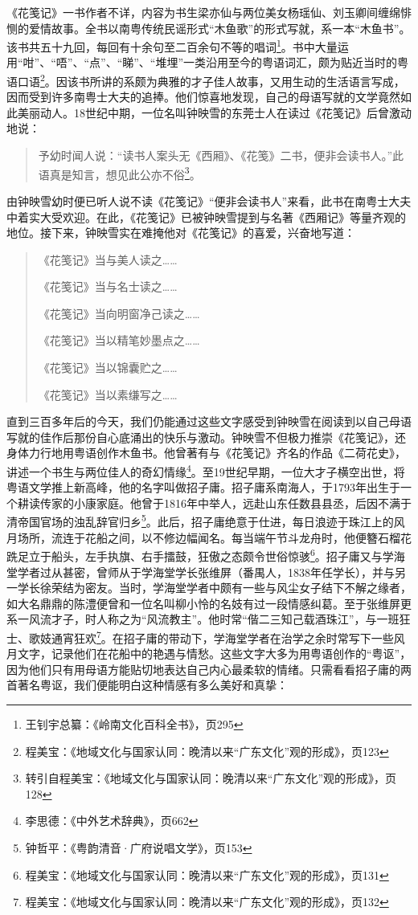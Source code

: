《花笺记》一书作者不详，内容为书生梁亦仙与两位美女杨瑶仙、刘玉卿间缠绵悱恻的爱情故事。全书以南粤传统民谣形式“木鱼歌”的形式写就，系一本“木鱼书”。该书共五十九回，每回有十余句至二百余句不等的唱词\footnote{王钊宇总纂：《岭南文化百科全书》，页295}。书中大量运用“咁”、“唔”、“点”、“睇”、“堆埋”一类沿用至今的粤语词汇，颇为贴近当时的粤语口语\footnote{程美宝：《地域文化与国家认同：晚清以来“广东文化”观的形成》，页123}。因该书所讲的系颇为典雅的才子佳人故事，又用生动的生活语言写成，因而受到许多南粤士大夫的追捧。他们惊喜地发现，自己的母语写就的文学竟然如此美丽动人。18世纪中期，一位名叫钟映雪的东莞士人在读过《花笺记》后曾激动地说：

\begin{quote}
予幼时闻人说：“读书人案头无《西厢》、《花笺》二书，便非会读书人。”此语真是知言，想见此公亦不俗\footnote{转引自程美宝：《地域文化与国家认同：晚清以来“广东文化”观的形成》，页128}。
\end{quote}

由钟映雪幼时便已听人说不读《花笺记》“便非会读书人”来看，此书在南粤士大夫中着实大受欢迎。在此，《花笺记》已被钟映雪提到与名著《西厢记》等量齐观的地位。接下来，钟映雪实在难掩他对《花笺记》的喜爱，兴奋地写道：

\begin{quote}

《花笺记》当与美人读之……

《花笺记》当与名士读之……

《花笺记》当向明窗净己读之……

《花笺记》当以精笔妙墨点之……

《花笺记》当以锦囊贮之……

《花笺记》当以素缣写之……
\end{quote}

直到三百多年后的今天，我们仍能通过这些文字感受到钟映雪在阅读到以自己母语写就的佳作后那份自心底涌出的快乐与激动。钟映雪不但极力推崇《花笺记》，还身体力行地用粤语创作木鱼书。他曾著有与《花笺记》齐名的作品《二荷花史》，讲述一个书生与两位佳人的奇幻情缘\footnote{李思德：《中外艺术辞典》，页662}。至19世纪早期，一位大才子横空出世，将粤语文学推上新高峰，他的名字叫做招子庸。招子庸系南海人，于1793年出生于一个耕读传家的小康家庭。他曾于1816年中举人，远赴山东任数县县丞，后因不满于清帝国官场的浊乱辞官归乡\footnote{钟哲平：《粤韵清音·广府说唱文学》，页153}。此后，招子庸绝意于仕进，每日浪迹于珠江上的风月场所，流连于花船之间，以不修边幅闻名。每当端午节斗龙舟时，他便簪石榴花跣足立于船头，左手执旗、右手擂鼓，狂傲之态颇令世俗惊骇\footnote{程美宝：《地域文化与国家认同：晚清以来“广东文化”观的形成》，页131}。招子庸又与学海堂学者过从甚密，曾师从于学海堂学长张维屏（番禺人，1838年任学长），并与另一学长徐荣结为密友。当时，学海堂学者中颇有一些与风尘女子结下不解之缘者，如大名鼎鼎的陈澧便曾和一位名叫柳小怜的名妓有过一段情感纠葛。至于张维屏更系一风流才子，时人称之为“风流教主”。他时常“偕二三知己载酒珠江”，与一班狂士、歌妓通宵狂欢\footnote{程美宝：《地域文化与国家认同：晚清以来“广东文化”观的形成》，页132}。在招子庸的带动下，学海堂学者在治学之余时常写下一些风月文字，记录他们在花船中的艳遇与情愁。这些文字大多为用粤语创作的“粤讴”，因为他们只有用母语方能贴切地表达自己内心最柔软的情绪。只需看看招子庸的两首著名粤讴，我们便能明白这种情感有多么美好和真挚：

